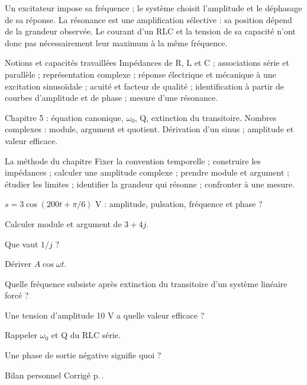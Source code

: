 Un excitateur impose sa fréquence ; le système choisit l’amplitude et le déphasage de sa réponse. La résonance est une amplification sélective : sa position dépend de la grandeur observée. Le courant d’un RLC et la tension de sa capacité n’ont donc pas nécessairement leur maximum à la même fréquence.
\begin{loi}{Notions et capacités travaillées}
Impédances de R, L et C ; associations série et parallèle ; représentation complexe ; réponse électrique et mécanique à une excitation sinusoïdale ; acuité et facteur de qualité ; identification à partir de courbes d’amplitude et de phase ; mesure d’une résonance.
\end{loi}

Chapitre 5 : équation canonique, $\omega_0$, Q, extinction du transitoire. Nombres complexes : module, argument et quotient. Dérivation d’un sinus ; amplitude et valeur efficace.

\begin{methode}{La méthode du chapitre}
Fixer la convention temporelle ; construire les impédances ; calculer une amplitude complexe ; prendre module et argument ; étudier les limites ; identifier la grandeur qui résonne ; confronter à une mesure.
\end{methode}


\begin{questions}
\item $s=3\cos(200t+\pi/6)$ V : amplitude, pulsation, fréquence et phase ?
\item Calculer module et argument de $3+4j$.
\item Que vaut $1/j$ ?
\item Dériver $A\cos\omega t$.
\item Quelle fréquence subsiste après extinction du transitoire d’un système linéaire forcé ?
\item Une tension d’amplitude 10 V a quelle valeur efficace ?
\item Rappeler $\omega_0$ et Q du RLC série.
\item Une phase de sortie négative signifie quoi ?
\end{questions}
\begin{docu}{Bilan personnel}
Corrigé p.\,\pageref{ch06-corr-diag}.
\end{docu}


